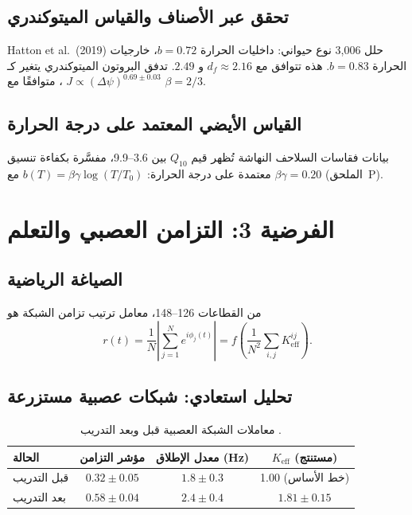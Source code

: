 \documentclass[11pt,a4paper]{article}
\begin{document}
	\subsection{تحقق عبر الأصناف والقياس الميتوكندري}
	
	Hatton et al.\ (2019) حلل 3,006 نوع حيواني: داخليات الحرارة \(b=0.72\)، خارجيات الحرارة \(b=0.83\). هذه تتوافق مع \(d_f \approx 2.16\) و \(2.49\). تدفق البروتون الميتوكندري يتغير كـ \(J \propto (\Delta \psi)^{0.69 \pm 0.03}\) \cite{West2023}، متوافقًا مع \(\beta=2/3\).
	
	\subsection{القياس الأيضي المعتمد على درجة الحرارة}
	
	بيانات فقاسات السلاحف النهاشة تُظهر قيم \(Q_{10}\) بين 3.6–9.9، مفسَّرة بكفاءة تنسيق معتمدة على درجة الحرارة: \(b(T) = \beta\gamma \log(T/T_0)\) مع \(\beta\gamma = 0.20\) (الملحق~P).
	
	\section{الفرضية 3: التزامن العصبي والتعلم}
	
	\subsection{الصياغة الرياضية}
	
	من القطاعات 126–148، معامل ترتيب تزامن الشبكة هو
	\begin{equation}
		r(t) = \frac{1}{N}\left|\sum_{j=1}^N e^{i\phi_j(t)}\right| = f\left(\frac{1}{N^2}\sum_{i,j} K_{\text{eff}}^{ij}\right).
		\label{eq:sync_order}
	\end{equation}
	
	\subsection{تحليل استعادي: شبكات عصبية مستزرعة}
	
	\begin{table}[H]
		\centering
		\caption{معاملات الشبكة العصبية قبل وبعد التدريب \cite{PLOS2025b}.}
		\label{tab:neural-training}
		\begin{tabular}{lccc}
			\toprule
			\textbf{الحالة} & \textbf{مؤشر التزامن} & \textbf{معدل الإطلاق (Hz)} & \(K_{\text{eff}}\) (مستنتج) \\
			\midrule
			قبل التدريب & \(0.32 \pm 0.05\) & \(1.8 \pm 0.3\) & 1.00 (خط الأساس) \\
			بعد التدريب & \(0.58 \pm 0.04\) & \(2.4 \pm 0.4\) & \(1.81 \pm 0.15\) \\
			\bottomrule
		\end{tabular}
	\end{table}
	
\end{document}
